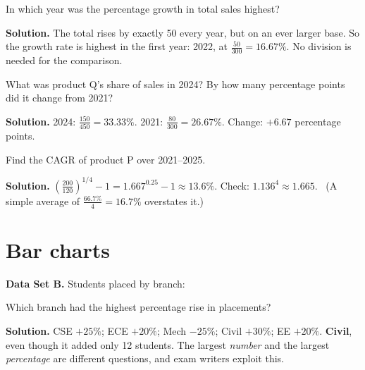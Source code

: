 \documentclass[11pt,a4paper,openany]{report}
\begin{document}
\begin{example}
In which year was the percentage growth in total sales highest?

\textbf{Solution.} The total rises by exactly 50 every year, but on an ever larger base. So the growth rate is highest in the first year: 2022, at $\frac{50}{300}=\mathbf{16.67\%}$. No division is needed for the comparison.
\end{example}

\begin{example}[share]
What was product Q's share of sales in 2024? By how many percentage points did it change from 2021?

\textbf{Solution.} 2024: $\frac{150}{450}=33.33\%$. 2021: $\frac{80}{300}=26.67\%$. Change: $+\mathbf{6.67}$ percentage points.
\end{example}

\begin{example}[CAGR]
Find the CAGR of product P over 2021--2025.

\textbf{Solution.} $\left(\frac{200}{120}\right)^{1/4}-1=1.667^{0.25}-1\approx\mathbf{13.6\%}$. Check: $1.136^4\approx1.665$. \checkmark\ (A simple average of $\frac{66.7\%}4=16.7\%$ overstates it.)
\end{example}

\section{Bar charts}
\textbf{Data Set B.} Students placed by branch:
\begin{center}
\end{center}

\begin{example}
Which branch had the highest percentage rise in placements?

\textbf{Solution.} CSE $+25\%$; ECE $+20\%$; Mech $-25\%$; Civil $+30\%$; EE $+20\%$. \textbf{Civil}, even though it added only 12 students. The largest \emph{number} and the largest \emph{percentage} are different questions, and exam writers exploit this.
\end{example}
\end{document}
